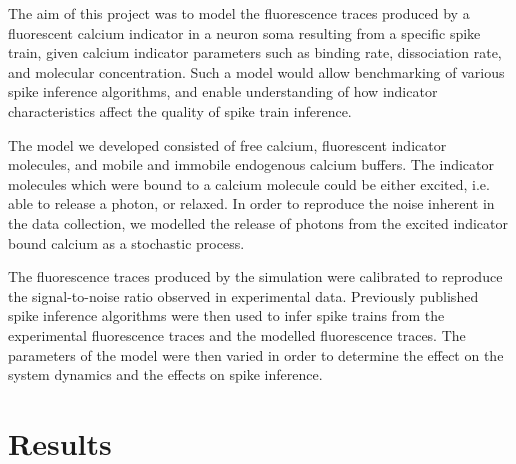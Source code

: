 The aim of this project was to model the fluorescence traces produced by a fluorescent calcium indicator in a neuron soma resulting from a specific spike train, given calcium indicator parameters such as binding rate, dissociation rate, and molecular concentration. Such a model would allow benchmarking of various spike inference algorithms, and enable understanding of how indicator characteristics affect the quality of spike train inference.

The model we developed consisted of free calcium, fluorescent indicator molecules, and mobile and immobile endogenous calcium buffers. The indicator molecules which were bound to a calcium molecule could be either excited, i.e. able to release a photon, or relaxed. In order to reproduce the noise inherent in the data collection, we modelled the release of photons from the excited indicator bound calcium as a stochastic process.

The fluorescence traces produced by the simulation were calibrated to reproduce the signal-to-noise ratio observed in experimental data. Previously published spike inference algorithms were then used to infer spike trains from the experimental fluorescence traces and the modelled fluorescence traces. The parameters of the model were then varied in order to determine the effect on the system dynamics and the effects on spike inference.

\section{Results}
